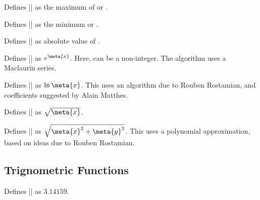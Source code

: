\begin{command}{\pgfmathmax{}}           
	Defines |\pgfmathresult| as the maximum of  or .                       
\end{command}

\begin{command}{\pgfmathmin{}}           
	Defines |\pgfmathresult| as the minimum  or .                       
\end{command}
	
\begin{command}{\pgfmathabs{}}                
	Defines |\pgfmathresult| as  absolute value of .                                 
\end{command}
	
\begin{command}{\pgfmathexp{}}                
	Defines |\pgfmathresult| as $e^{\meta{x}}$. Here,  can be a 
	non-integer. The algorithm	uses a Maclaurin series.               
\end{command}

\begin{command}{\pgfmathln{}}                
	Defines |\pgfmathresult| as $\ln{\meta{x}}$. This uses an algorithm
	due to Rouben Rostamian, and coefficients suggested by
	Alain Matthes.             
\end{command}
	
\begin{command}{\pgfmathsqrt{}} 
	Defines |\pgfmathresult| as $\sqrt{\meta{x}}$. 
\end{command}
	
\begin{command}{\pgfmathveclen{}}        
	Defines |\pgfmathresult| as $\sqrt{\meta{x}^2+\meta{y}^2}$. This uses
	a polynomial approximation, based on ideas due to Rouben Rostamian.                                    
\end{command}

\subsection{Trignometric Functions}

\label{pgfmath-trigonmetry}

\begin{command}{\pgfmathpi}
  	Defines |\pgfmathresult| as $3.14159$.
\end{command}
   
